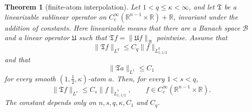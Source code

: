 \documentclass[12pt,leqno]{amsart}
\numberwithin{equation}{section}
\newcommand{\R}{\mathbb R}
\theoremstyle{plain}
\newtheorem{theorem}[equation]{Theorem}
\theoremstyle{remark}
\begin{document}
\begin{theorem}[finite-atom interpolation]\label{T.finiteinterp}
Let $1<q\le\kappa<\infty$, and let $\mathfrak T$ be a linearizable sublinear
operator on $C_c^\infty(\R^{n-1}\times\R)+\R$, invariant under the addition
of constants. Here linearizable means that there are a Banach space
$\mathcal B$ and a linear operator $\mathfrak U$ such that
$\mathfrak Tf=\|\mathfrak Uf\|_{\mathcal B}$ pointwise. Assume that
\[
 \|\mathfrak Tf\|_{L^q}\le C_q\|f\|_{\dot L^q_{1,1/2}}
\]
and that
\[
 \|\mathfrak Ta\|_{L^1}\le C_1
\]
for every smooth $(1,\tfrac12,\kappa)$-atom $a$. Then, for every $1<s<q$,
\begin{equation}\label{E.finiteinterp}
 \|\mathfrak Tf\|_{L^s}\le C_s\|f\|_{\dot L^s_{1,1/2}},
 \qquad f\in C_c^\infty(\R^{n-1}\times\R).
\end{equation}
The constant depends only on $n,s,q,\kappa,C_1$ and $C_q$.
\end{theorem}
\end{document}
